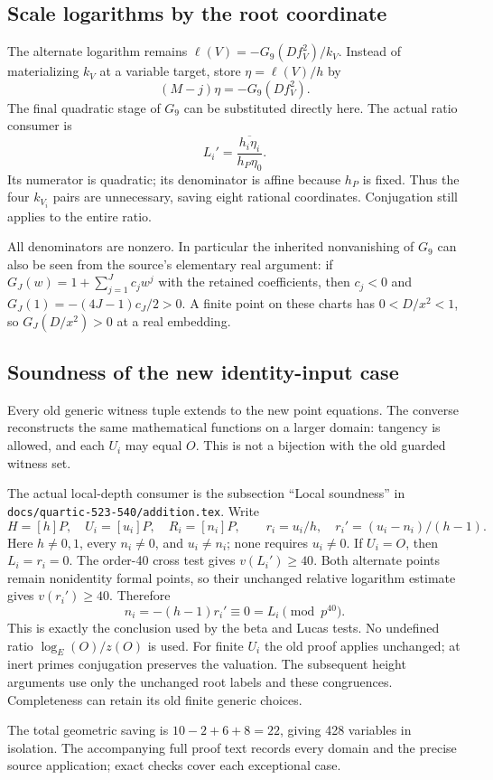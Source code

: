 \subsection{Scale logarithms by the root coordinate}
The alternate logarithm remains
$\ell(V)=-G_9(Df_V^2)/k_V$. Instead of materializing $k_V$ at a variable
target, store $\eta=\ell(V)/h$ by
\[
 (M-j)\eta=-G_9(Df_V^2).
\]
The final quadratic stage of $G_9$ can be substituted directly here.
The actual ratio consumer is
\[
 L_i'=\overline{\frac{h_i\eta_i}{h_P\eta_0}}.
\]
Its numerator is quadratic; its denominator is affine because $h_P$ is
fixed. Thus the four $k_{V_i}$ pairs are unnecessary, saving eight rational
coordinates. Conjugation still applies to the entire ratio.

All denominators are nonzero. In particular the inherited nonvanishing of
$G_9$ can also be seen from the source's elementary real argument:
if $G_J(w)=1+\sum_{j=1}^J c_jw^j$ with the retained coefficients, then
$c_j<0$ and $G_J(1)=-(4J-1)c_J/2>0$. A finite point on these charts has
$0<D/x^2<1$, so $G_J(D/x^2)>0$ at a real embedding.

\subsection{Soundness of the new identity-input case}
Every old generic witness tuple extends to the new point equations.
The converse reconstructs the same mathematical functions on a larger
domain: tangency is allowed, and each $U_i$ may equal $O$. This is not
a bijection with the old guarded witness set.

The actual local-depth consumer is the subsection ``Local soundness'' in\\
\nolinkurl{docs/quartic-523-540/addition.tex}. Write
\[
 H=[h]P,\quad U_i=[u_i]P,\quad R_i=[n_i]P,\qquad
 r_i=u_i/h,\quad r_i'=(u_i-n_i)/(h-1).
\]
Here $h\ne0,1$, every $n_i\ne0$, and $u_i\ne n_i$; none requires
$u_i\ne0$. If $U_i=O$, then $L_i=r_i=0$. The order-40 cross test gives
$v(L_i')\ge40$. Both alternate points remain nonidentity formal points,
so their unchanged relative logarithm estimate gives $v(r_i')\ge40$.
Therefore
\[
 n_i=-(h-1)r_i'\equiv0=L_i\pmod{p^{40}}.
\]
This is exactly the conclusion used by the beta and Lucas tests. No
undefined ratio $\log_E(O)/z(O)$ is used. For finite $U_i$ the old proof
applies unchanged; at inert primes conjugation preserves the valuation.
The subsequent height arguments use only the unchanged root labels and
these congruences. Completeness can retain its old finite generic choices.

The total geometric saving is $10-2+6+8=22$, giving 428 variables in
isolation. The accompanying full proof text records every domain and
the precise source application; exact checks cover each exceptional case.
